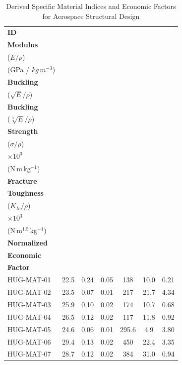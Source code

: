 \begin{table}[H]
\centering
\caption{Derived Specific Material Indices and Economic Factors for Aerospace Structural Design }
\label{tab:derived-material-properties}
\renewcommand{\arraystretch}{1.2}
\begin{tabular}{|l|c|c|c|c|c|c|}
\hline
\textbf{ID}
  & \makecell{\textbf{Specific}\\\textbf{Modulus}\\($E/\rho$)\\(GPa / $kg\,m^{-3}$)}
  & \makecell{\textbf{Column}\\\textbf{Buckling}\\($\sqrt{E}/\rho$)}
  & \makecell{\textbf{Plate}\\\textbf{Buckling}\\($\sqrt[3]{E}/\rho$)}
  & \makecell{\textbf{Specific}\\\textbf{Strength}\\($\sigma/\rho$)\\$\times10^{3}$\\(N\,m\,kg$^{-1}$)}
  & \makecell{\textbf{Specific}\\\textbf{Fracture}\\\textbf{Toughness}\\($K_{Ic}/\rho$)\\$\times10^{3}$\\(N\,m$^{1.5}$\,kg$^{-1}$)} 
  & \makecell{\textbf{Total}\\\textbf{Normalized}\\\textbf{Economic}\\\textbf{Factor}} \\
\hline\hline
HUG-MAT-01 & 22.5 & 0.24 & 0.05 & 138   & 10.0 & 0.21 \\ \hline
HUG-MAT-02 & 23.5 & 0.07 & 0.01 & 217   & 21.7 & 4.34 \\ \hline
HUG-MAT-03 & 25.9 & 0.10 & 0.02 & 174   & 10.7 & 0.68 \\ \hline
HUG-MAT-04 & 26.5 & 0.12 & 0.02 & 117   & 11.8 & 0.92 \\ \hline
HUG-MAT-05 & 24.6 & 0.06 & 0.01 & 295.6 & 4.9  & 3.80 \\ \hline
HUG-MAT-06 & 29.4 & 0.13 & 0.02 & 450   & 22.4 & 3.35 \\ \hline
HUG-MAT-07 & 28.7 & 0.12 & 0.02 & 384   & 31.0 & 0.94 \\
\hline
\end{tabular}
\end{table}

